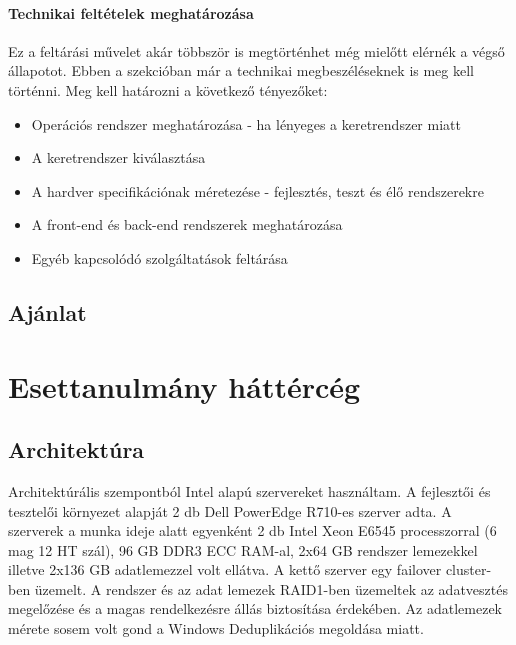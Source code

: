 \documentclass[12pt,oneside,justify,table]{book}
\begin{document}
\subsubsection{Technikai feltételek meghatározása}
Ez a feltárási művelet akár többször is megtörténhet még mielőtt elérnék a végső állapotot. Ebben a szekcióban már a technikai megbeszéléseknek is meg kell történni. 
Meg kell határozni a következő tényezőket:
\begin{itemize}
	\item Operációs rendszer meghatározása - ha lényeges a keretrendszer miatt
	\item A keretrendszer kiválasztása
	\item A hardver specifikációnak méretezése - fejlesztés, teszt és élő rendszerekre
	\item A front-end és back-end rendszerek meghatározása
	\item Egyéb kapcsolódó szolgáltatások feltárása 
\end{itemize}


\section{Ajánlat}



\chapter{Esettanulmány háttércég}

\section{Architektúra}

Architektúrális szempontból Intel alapú szervereket használtam. A fejlesztői és tesztelői környezet alapját 2 db Dell PowerEdge R710-es szerver adta. A szerverek a munka ideje alatt egyenként 2 db Intel Xeon E6545 processzorral (6 mag 12 HT szál), 96 GB DDR3 ECC RAM-al, 2x64 GB rendszer lemezekkel illetve 2x136 GB adatlemezzel volt ellátva. A kettő szerver egy failover cluster-ben üzemelt. A rendszer és az adat lemezek RAID1-ben üzemeltek az adatvesztés megelőzése és a magas rendelkezésre állás biztosítása érdekében. Az adatlemezek mérete sosem volt gond a Windows Deduplikációs megoldása miatt.
\end{document}
